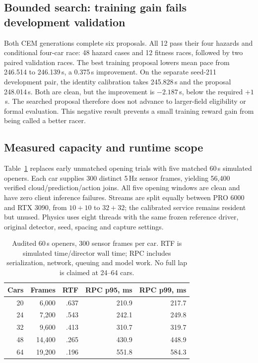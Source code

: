 \documentclass[conference]{IEEEtran}
\begin{document}
\subsection{Bounded search: training gain fails development validation}
Both CEM generations complete six proposals. All 12 pass their four hazards and conditional four-car race: 48 hazard cases and 12 fitness races, followed by two paired validation races. The best training proposal lowers mean pace from 246.514 to 246.139\,s, a 0.375\,s improvement. On the separate seed-211 development pair, the identity calibration takes 245.828\,s and the proposal 248.014\,s. Both are clean, but the improvement is $-2.187$\,s, below the required $+1$\,s. The searched proposal therefore does not advance to larger-field eligibility or formal evaluation. This negative result prevents a small training reward gain from being called a better racer.

\subsection{Measured capacity and runtime scope}
Table~\ref{tab:capacity} replaces early unmatched opening trials with five matched 60\,s simulated openers. Each car supplies 300 distinct 5\,Hz sensor frames, yielding 56,400 verified cloud/prediction/action joins. All five opening windows are clean and have zero client inference failures. Streams are split equally between PRO 6000 and RTX 3090, from $10+10$ to $32+32$; the calibrated service remains resident but unused. Physics uses eight threads with the same frozen reference driver, original detector, seed, spacing and capture settings.

\begin{table}[t]
\caption{Audited 60\,s openers, 300 sensor frames per car. RTF is simulated time/director wall time; RPC includes serialization, network, queuing and model work. No full lap is claimed at 24--64 cars.}
\label{tab:capacity}
\centering\small\setlength{\tabcolsep}{4pt}
\begin{tabular}{rrrrr}
\toprule
Cars & Frames & RTF & RPC p95, ms & RPC p99, ms\\
\midrule
20 & 6,000 & .637 & 210.9 & 217.7\\
24 & 7,200 & .543 & 242.1 & 249.8\\
32 & 9,600 & .413 & 310.7 & 319.7\\
48 & 14,400 & .265 & 430.9 & 448.9\\
64 & 19,200 & .196 & 551.8 & 584.3\\
\bottomrule
\end{tabular}
\end{table}
\end{document}
